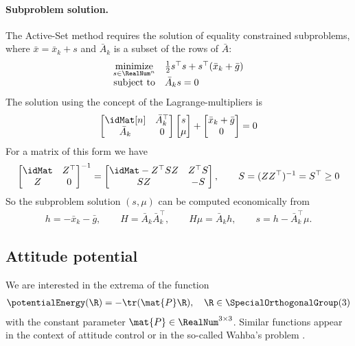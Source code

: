 \paragraph{Subproblem solution.}
The Active-Set method requires the solution of equality constrained subproblems, where $\bar{x} = \bar{x}_k + s$ and $\bar{A}_k$ is a subset of the rows of $\bar{A}$:
\begin{align}
 \begin{array}{rl}
  \underset{s \in \RealNum^{n}}{\text{minimize}} & \tfrac{1}{2} s^\top s + s^\top (\bar{x}_k + \bar{g})
  \\[1ex]
  \text{subject to} & \bar{A}_k s = 0
 \end{array}
\end{align}
The solution using the concept of the Lagrange-multipliers is
\begin{align}
 \begin{bmatrix} \idMat[n] & \bar{A}_k^\top \\ \bar{A}_k & 0 \end{bmatrix}
 \begin{bmatrix} s \\ \mu \end{bmatrix}
 +
 \begin{bmatrix} \bar{x}_k + \bar{g} \\ 0 \end{bmatrix}
 = 0
\end{align}
For a matrix of this form we have
\begin{align}
 \begin{bmatrix} \idMat & Z^\top \\ Z & 0 \end{bmatrix}^{-1} 
 =
 \begin{bmatrix} \idMat -  Z^\top S Z & Z^\top S \\ S Z & -S \end{bmatrix},
\qquad 
 S = (Z Z^\top)^{-1} = S^\top \geq 0
\end{align}
So the subproblem solution $(s, \mu)$ can be computed economically from
\begin{align}
 h = -\bar{x}_k - \bar{g},
\qquad
 H = \bar{A}_k \bar{A}_k^\top,
\qquad
 H \mu = \bar{A}_k h,
\qquad
 s = h - \bar{A}_k^\top \mu.
\end{align}

\subsection{Attitude potential}\label{sec:AppendixAttitudePotential}
We are interested in the extrema of the function
\begin{align}
 \potentialEnergy(\R) = -\tr(\mat{P} \R), \quad \R \in \SpecialOrthogonalGroup(3)
\end{align}
with the constant parameter $\mat{P} \in \RealNum^{3\times3}$.
Similar functions appear in the context of attitude control \cite{Koditschek:TotalEnergy} or in the so-called Wahba's problem \cite{Wahba:WahbaProblem}.


